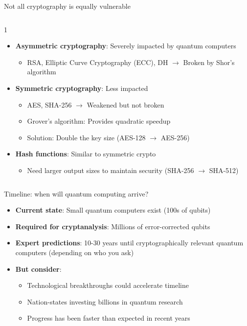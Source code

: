 \documentclass[aspectratio=169, lualatex]{beamer} %
\def\envert#1{\textcolor{vert}{#1}}
\def\enrouge#1{\textcolor{rouge}{#1}}
\begin{document}
\begin{frame}{Not all cryptography is equally vulnerable}
	\begin{columns}[c]
		\begin{column}{1\textwidth}
			\begin{itemize}
				\item \textbf{Asymmetric cryptography}: Severely impacted by quantum computers
				      \begin{itemize}
					      \item RSA, Elliptic Curve Cryptography (ECC), DH $\rightarrow$ \enrouge{Broken by Shor's algorithm}
				      \end{itemize}\pause
				\item \textbf{Symmetric cryptography}: Less impacted
				      \begin{itemize}
					      \item AES, SHA-256 $\rightarrow$ Weakened but not broken
					      \item \enrouge{Grover's algorithm: Provides quadratic speedup}
					      \item Solution: Double the key size \envert{(AES-128 $\rightarrow$ AES-256)}%
				      \end{itemize}\pause
				\item \textbf{Hash functions}: Similar to symmetric crypto
				      \begin{itemize}
					      \item Need larger output sizes to maintain security \envert{(SHA-256 $\rightarrow$ SHA-512)}
				      \end{itemize}
			\end{itemize}
		\end{column}
	\end{columns}
\end{frame}

\begin{frame}{Timeline: when will quantum computing arrive?}
	\begin{itemize}
		\item \textbf{Current state}: Small quantum computers exist (100s of qubits)
		\item \textbf{Required for cryptanalysis}: Millions of error-corrected qubits
		\item \textbf{Expert predictions}: 10-30 years until cryptographically relevant quantum computers (depending on who you ask)
		\item \textbf{But consider}:
		      \begin{itemize}
			      \item Technological breakthroughs could accelerate timeline
			      \item Nation-states investing billions in quantum research
			      \item Progress has been faster than expected in recent years
		      \end{itemize}
	\end{itemize}
\end{frame}
\end{document}
